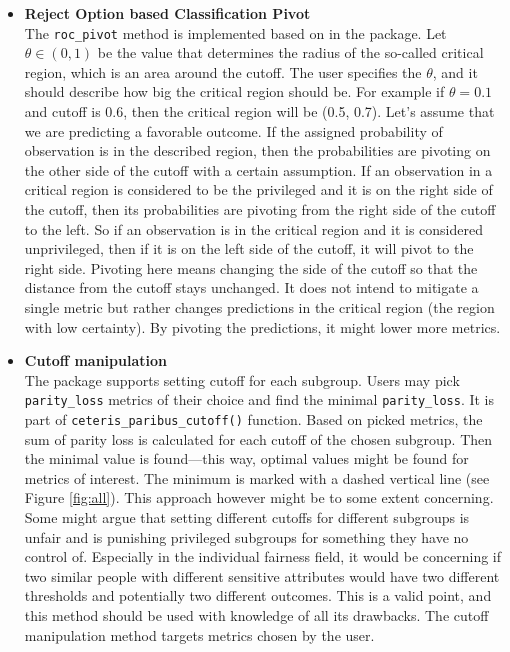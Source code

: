 \begin{itemize}
\tightlist
\item
  \textbf{Reject Option based Classification Pivot}\\
  The \texttt{roc\_pivot} method is implemented based on
  \citet{postKamiran} in the  package. Let
  \(\theta \in (0,1)\) be the value that determines the radius of the
  so-called critical region, which is an area around the cutoff. The
  user specifies the \(\theta\), and it should describe how big the
  critical region should be. For example if \(\theta = 0.1\) and cutoff
  is 0.6, then the critical region will be (0.5, 0.7). Let's assume that
  we are predicting a favorable outcome. If the assigned probability of
  observation is in the described region, then the probabilities are
  pivoting on the other side of the cutoff with a certain assumption. If
  an observation in a critical region is considered to be the privileged
  and it is on the right side of the cutoff, then its probabilities are
  pivoting from the right side of the cutoff to the left. So if an
  observation is in the critical region and it is considered
  unprivileged, then if it is on the left side of the cutoff, it will
  pivot to the right side. Pivoting here means changing the side of the
  cutoff so that the distance from the cutoff stays unchanged. It does
  not intend to mitigate a single metric but rather changes predictions
  in the critical region (the region with low certainty). By pivoting
  the predictions, it might lower more metrics.\\
\item
  \textbf{Cutoff manipulation}\\
  The  package supports setting cutoff for each
  subgroup. Users may pick \texttt{parity\_loss} metrics of their choice
  and find the minimal \texttt{parity\_loss}. It is part of
  \texttt{ceteris\_paribus\_cutoff()} function. Based on picked metrics,
  the sum of parity loss is calculated for each cutoff of the chosen
  subgroup. Then the minimal value is found---this way, optimal values
  might be found for metrics of interest. The minimum is marked with a
  dashed vertical line (see Figure \ref{fig:all}). This approach however
  might be to some extent concerning. Some might argue that setting
  different cutoffs for different subgroups is unfair and is punishing
  privileged subgroups for something they have no control of. Especially
  in the individual fairness field, it would be concerning if two
  similar people with different sensitive attributes would have two
  different thresholds and potentially two different outcomes. This is a
  valid point, and this method should be used with knowledge of all its
  drawbacks. The cutoff manipulation method targets metrics chosen by
  the user.
\end{itemize}

